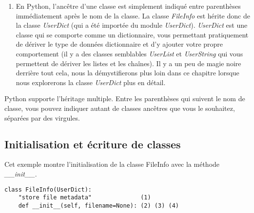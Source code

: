 \begin{enumerate}
\item{En Python, l'ancêtre d'une classe est simplement indiqué entre parenthèses immédiatement après le nom de la classe. La classe \emph{FileInfo} est hérite donc de la classe  \emph{UserDict} (qui a été importée du module \emph{UserDict}). \emph{UserDict} est une classe qui se comporte comme un dictionnaire, vous permettant pratiquement de dériver le type de données dictionnaire et d'y ajouter votre propre comportement (il y a des classes semblables \emph{UserList} et \emph{UserString} qui vous permettent de dériver les listes et les chaînes). Il y a un peu de magie noire derrière tout cela, nous la démystifierons plus loin dans ce chapitre lorsque nous explorerons la classe \emph{UserDict} plus en détail.}
\end{enumerate}


Python supporte l'héritage multiple. Entre les parenthèses qui suivent le nom de classe, vous pouvez indiquer autant de classes ancêtres que vous le souhaitez, séparées par des virgules.

\subsection{Initialisation et écriture de classes}

Cet exemple montre l'initialisation de la classe FileInfo avec la méthode \emph{\_\_init\_\_}.

\begin{example}
\begin{lstlisting}
class FileInfo(UserDict):
    "store file metadata"              (1)
    def __init__(self, filename=None): (2) (3) (4)
\end{lstlisting}
\end{example}

